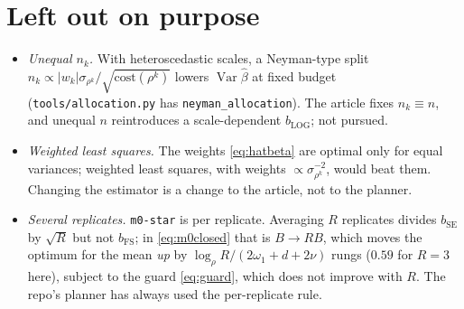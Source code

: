 \documentclass[11pt]{article}
\newcommand{\Var}{\operatorname{Var}}
\newcommand{\cost}{\mathrm{cost}}
\newcommand{\bSE}{b_{\mathrm{SE}}}
\newcommand{\bFS}{b_{\mathrm{FS}}}
\newcommand{\bLOG}{b_{\mathrm{LOG}}}
\begin{document}
\section{Left out on purpose}

\begin{itemize}
  \item \emph{Unequal $n_k$.} With heteroscedastic scales, a Neyman-type split
  $n_k\propto|w_k|\sigma_{\rho^k}/\sqrt{\cost(\rho^k)}$ lowers $\Var\hat\beta$ at
  fixed budget (\texttt{tools/allocation.py} has \texttt{neyman\_allocation}).
  The article fixes $n_k\equiv n$, and unequal $n$ reintroduces a
  scale-dependent $\bLOG$; not pursued.
  \item \emph{Weighted least squares.} The weights \eqref{eq:hatbeta} are optimal
  only for equal variances; weighted least squares, with weights
  $\propto\sigma_{\rho^k}^{-2}$, would beat them. Changing
  the estimator is a change to the article, not to the planner.
  \item \emph{Several replicates.} \texttt{m0-star} is per replicate. Averaging
  $R$ replicates divides $\bSE$ by $\sqrt R$ but not $\bFS$; in
  \eqref{eq:m0closed} that is $B\to RB$, which moves the optimum for the mean
  \emph{up} by $\log_\rho R/(2\omega_1+d+2\nu)$ rungs ($0.59$ for $R=3$ here),
  subject to the guard \eqref{eq:guard}, which does not improve with $R$.
  The repo's planner has always used the per-replicate rule.
\end{itemize}
\end{document}
